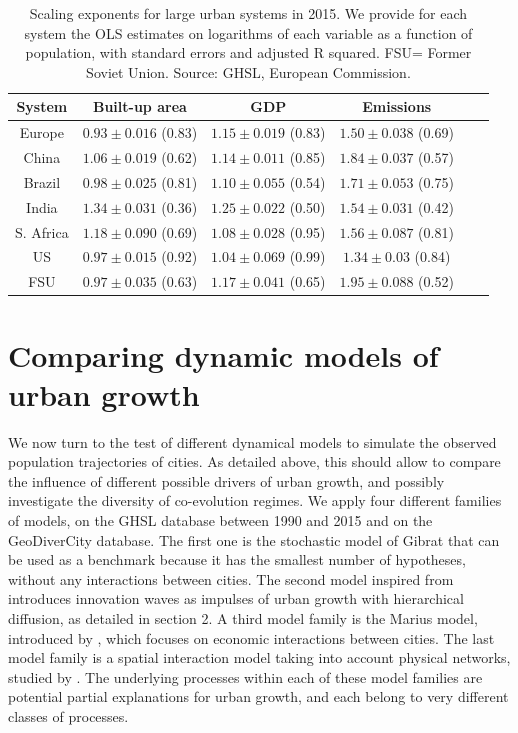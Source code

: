 \documentclass[11pt]{article}
\begin{document}
\begin{table}
\caption{Scaling exponents for large urban systems in 2015. We provide for each system the OLS estimates on logarithms of each variable as a function of population, with standard errors and adjusted R squared. FSU= Former Soviet Union. Source: GHSL, European Commission.\label{tab:tab4}}
\centering
\begin{tabular}{cccccc}
    \toprule
    System & Built-up area & GDP & Emissions \\
    \midrule
Europe & $0.93 \pm 0.016$ (0.83) & $1.15 \pm 0.019$ (0.83) & $1.50 \pm 0.038$ (0.69) \\
China & $1.06 \pm 0.019$ (0.62)  & $1.14 \pm 0.011$ (0.85)  & $1.84 \pm 0.037$ (0.57) \\
Brazil & $0.98 \pm 0.025$ (0.81)  & $1.10 \pm 0.055 $ (0.54) & $1.71 \pm 0.053$ (0.75) \\
India & $1.34 \pm 0.031$ (0.36) & $1.25 \pm 0.022$ (0.50) & $1.54 \pm 0.031$ (0.42) \\
S. Africa & $1.18 \pm 0.090$ (0.69) & $1.08 \pm 0.028$ (0.95) & $1.56 \pm 0.087$  (0.81) \\
US & $0.97 \pm 0.015$ (0.92) & $1.04 \pm 0.069$ (0.99) &$ 1.34 \pm 0.03$ (0.84) \\
FSU & $0.97 \pm 0.035$ (0.63) & $1.17 \pm 0.041$ (0.65) & $1.95 \pm 0.088$ (0.52)\\
\bottomrule
\end{tabular}
\end{table}



\section{Comparing dynamic models of urban growth}

We now turn to the test of different dynamical models to simulate the observed population trajectories of cities. As detailed above, this should allow to compare the influence of different possible drivers of urban growth, and possibly investigate the diversity of co-evolution regimes. We apply four different families of models, on the GHSL database between 1990 and 2015 and on the GeoDiverCity database. The first one is the stochastic model of Gibrat that can be used as a benchmark because it has the smallest number of hypotheses, without any interactions between cities. The second model inspired from \cite{favaro2007croissance} introduces innovation waves as impulses of urban growth with hierarchical diffusion, as detailed in section 2. A third model family is the Marius model, introduced by \cite{cottineau2014evolution}, which focuses on economic interactions between cities. The last model family is a spatial interaction model taking into account physical networks, studied by \cite{raimbault2020indirect}. The underlying processes within each of these model families are potential partial explanations for urban growth, and each belong to very different classes of processes.
\end{document}
